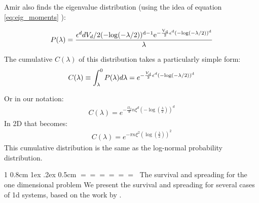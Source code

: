 \documentclass[onecolumn,fleqn,notitlepage,secnumarabic]{revtex4}
\makeatletter
\newenvironment{fminipage}%
  {\begin{Sbox}\begin{minipage}}%
  {\end{minipage}\end{Sbox}\fbox{\TheSbox}}
\def\section{%
  \@startsection
    {section}%
    {1}%
    {\z@}%
    {0.8cm \@plus1ex \@minus .2ex}%
    {0.5cm}%
    {\Large\bf $=\!=\!=\!=\!=\!=\;$}%
}%
\makeatother
\begin{document}
Amir also finds the eigenvalue distribution (using the idea of equation \eqref{eq:eig_moments} ):

\begin{fminipage}{\textwidth}
\begin{align} P(\lambda)=  \frac{\epsilon^d d V_d /2
(-\rm{log}(-\lambda/2))^{d-1} e^{-\frac{V_d}{2} \epsilon^d
(-\rm{log}(-\lambda/2))^d}}{\lambda} \end{align}


The cumulative $C(\lambda)$ of this distribution takes a
particularly simple form: 
\begin{align} C(\lambda)\equiv \int_\lambda^0
P(\lambda)d\lambda= e^{-\frac{V_d}{2} \epsilon^d
(-\rm{log}(-\lambda/2))^d} \end{align}
\end{fminipage}
Or in our notation:
\begin{align} C(\lambda)= e^{-\frac{\Omega_d}{d} n\xi^d \left( -\log(\frac{\lambda}{2})\right)^d}  \end{align}
In 2D that becomes:
\begin{align} C(\lambda) = e^{-\pi n\xi^2 \left(\log(\frac{\lambda}{2})\right)^2 } \end{align}
This cumulative distribution is the same as the log-normal probability distribution. 

\section{The survival and spreading for the one dimensional problem}\label{sec:alexander}
We present the survival and spreading for several cases of 1d systems, based on the work by \textcite{Alexander:1981:RMP}.
\end{document}
